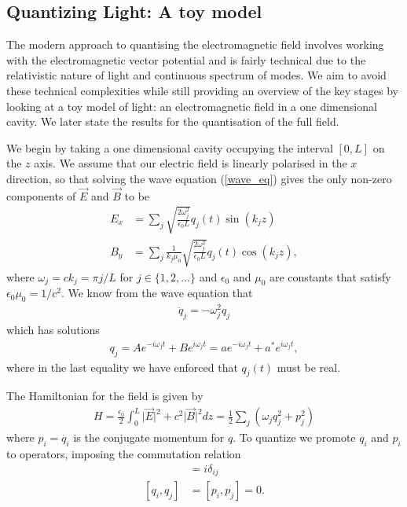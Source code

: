\subsection{Quantizing Light: A toy model}

The modern approach to quantising the electromagnetic field involves working with the electromagnetic vector potential and is fairly technical due to the relativistic nature of light and continuous spectrum of modes. We aim to avoid these technical complexities while still providing an overview of the key stages by looking at a toy model of light: an electromagnetic field in a one dimensional cavity. We later state the results for the quantisation of the full field.

We begin by taking a one dimensional cavity occupying the interval $[0, L]$ on the $z$ axis. We assume that our electric field is linearly polarised in the $x$ direction, so that solving the wave equation (\ref{wave_eq}) gives the only non-zero components of $\vec{E}$ and $\vec{B}$ to be
\begin{align}\label{toy_classical_e}
  E_x &= \sum_j \sqrt{\frac{2\omega_j^2}{\epsilon_0 L}} q_j(t) \sin(k_j z) \\
  B_y &= \sum_j \frac{1}{k_j \mu_0} \sqrt{\frac{2\omega_j^2}{\epsilon_0 L}} q_j(t) \cos(k_j z),
\end{align}
where $\omega_j = ck_j = \pi j/L$ for $j \in \{1, 2, \dots\}$ and $\epsilon_0$ and $\mu_0$ are constants that satisfy $\epsilon_0 \mu_0 = 1/c^2$. We know from the wave equation that
\begin{align}
  \ddot{q}_j = -\omega_j^2 q_j
\end{align}
which has solutions
\begin{align}
  q_j = Ae^{-i\omega_j t} + Be^{i\omega_j t} = ae^{-i\omega_j t} + a^*e^{i\omega_j t},
\end{align}
where in the last equality we have enforced that $q_j(t)$ must be real.

The Hamiltonian for the field is given by
\begin{align}
  H = \frac{\epsilon_0}{2} \int_0^L \vert \vec{E}\vert^2 + c^2\vert\vec{B}\vert^2 dz 
  = \frac{1}{2} \sum_j \left(\omega_j q_j^2 + p_j^2\right)
\end{align}
where $p_i = \dot{q_i}$ is the conjugate momentum for $q$. To quantize we promote $q_i$ and $p_i$ to operators, imposing the commutation relation
\begin{align}
  [q_i, p_j] &= i\delta_{ij} \\
  [q_i, q_j] &= [p_i, p_j] = 0.
\end{align}

